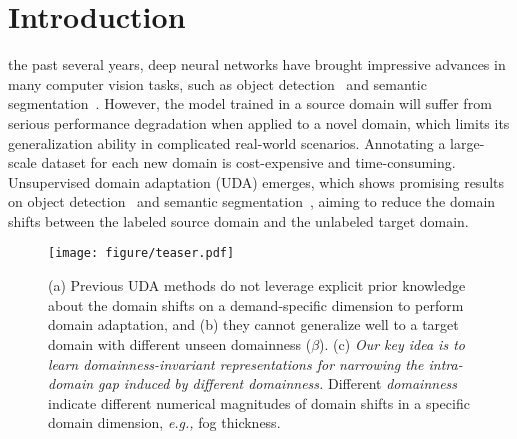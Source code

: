 \documentclass[10pt,journal,compsoc]{IEEEtran}
\begin{document}
\section{Introduction}\label{sec:introduction}
 the past several years, deep neural networks have brought impressive advances in many computer vision tasks, such as object detection~\cite{girshick2014rich,ren2016faster,chen2017s,focal_loss,shen2019object,cai2019cascade,oksuz2020imbalance,Tan_2022_TPAMI_mirror,zhou222transvod} and semantic segmentation~\cite{fcn, chen2017deeplab,chen2018encoder,zhao2017pspnet,feng2020dmt,lin2017exploring,badrinarayanan2017segnet,night_city}. 
However, the model trained in a source domain will suffer from serious performance degradation when applied to a novel domain, which limits its generalization ability in complicated real-world scenarios. Annotating a large-scale dataset for each new domain is cost-expensive and time-consuming. 
Unsupervised domain adaptation (UDA) emerges, which shows promising results on object detection~\cite{DA-Faster-RCNN,SWDA,MAF,SCDA,GPA,HTCN,ICR-CCR,SCL,hsu2020every,ATF,sindagi2019prior,zhao2020collaborative,ART-PCA,PIT} and semantic segmentation~\cite{ASA,CLANv2,CyCADA, AdaptSegNet,BDL,LTIR,CLAN,SIM, DISE,FDA,STAR,PCEDA,IntraDA,APODA,FADA,DADA,choi2019self,SIBAN,CRST,CBST,Conservative_loss,AdaptPatch,guo2021label},
aiming to reduce the domain shifts between the labeled source domain and the unlabeled target domain. 



\begin{figure}[!t] 
\centering
\texttt{[image: figure/teaser.pdf]}
\caption{
(a) Previous UDA methods do not leverage explicit prior knowledge about the domain shifts on a demand-specific dimension to perform domain adaptation, and (b) they cannot generalize well to a target domain with different unseen domainness ($\beta$). (c) \textit{Our key idea is to learn  domainness-invariant representations for narrowing the intra-domain gap induced by different domainness.} Different \textit{domainness} indicate different numerical magnitudes of domain shifts in a specific domain dimension, \emph{e.g.,} fog thickness. 
}
\label{teaser}
\end{figure}
\end{document}
